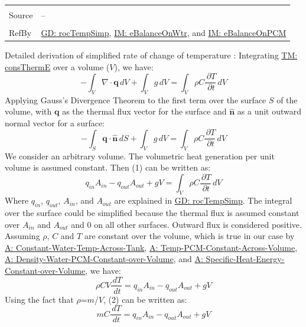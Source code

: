 \documentclass[12pt]{article}
\begin{document}
\begin{minipage}{\textwidth}
\begin{tabular}{>{\raggedright}p{}>{\raggedright\arraybackslash}p{}}
\\ \midrule \\
Source & --
\\ \midrule \\
RefBy & \hyperref[GD:rocTempSimp]{GD: rocTempSimp}, \hyperref[IM:eBalanceOnWtr]{IM: eBalanceOnWtr}, and \hyperref[IM:eBalanceOnPCM]{IM: eBalanceOnPCM}
\\ \bottomrule
\end{tabular}
\end{minipage}
Detailed derivation of simplified rate of change of temperature :
Integrating \hyperref[TM:consThermE]{TM: consThermE} over a volume ($V$), we have:
\begin{displaymath}
-\int_{V}{∇\cdot{}\mathbf{q}}\,dV+\int_{V}{g}\,dV=\int_{V}{ρ C \frac{\,\partial{}T}{\,\partial{}t}}\,dV
\end{displaymath}
Applying Gauss's Divergence Theorem to the first term over the surface $S$ of the volume, with $\mathbf{q}$ as the thermal flux vector for the surface and $\mathbf{\hat{n}}$ as a unit outward normal vector for a surface:
\begin{displaymath}
-\int_{S}{\mathbf{q}\cdot{}\mathbf{\hat{n}}}\,dS+\int_{V}{g}\,dV=\int_{V}{ρ C \frac{\,\partial{}T}{\,\partial{}t}}\,dV
\end{displaymath}
We consider an arbitrary volume. The volumetric heat generation per unit volume is assumed constant. Then (1) can be written as:
\begin{displaymath}
{q_{in}} {A_{in}}-{q_{out}} {A_{out}}+g V=\int_{V}{ρ C \frac{\,\partial{}T}{\,\partial{}t}}\,dV
\end{displaymath}
Where ${q_{in}}$, ${q_{out}}$, ${A_{in}}$, and ${A_{out}}$ are explained in \hyperref[GD:rocTempSimp]{GD: rocTempSimp}. The integral over the surface could be simplified because the thermal flux is assumed constant over ${A_{in}}$ and ${A_{out}}$ and $0$ on all other surfaces. Outward flux is considered positive. Assuming $ρ$, $C$ and $T$ are constant over the volume, which is true in our case by \hyperref[assumpCWTAT]{A: Constant-Water-Temp-Across-Tank}, \hyperref[assumpTPCAV]{A: Temp-PCM-Constant-Across-Volume}, \hyperref[assumpDWPCoV]{A: Density-Water-PCM-Constant-over-Volume}, and \hyperref[assumpSHECov]{A: Specific-Heat-Energy-Constant-over-Volume}, we have:
\begin{displaymath}
ρ C V \frac{\,dT}{\,dt}={q_{in}} {A_{in}}-{q_{out}} {A_{out}}+g V
\end{displaymath}
Using the fact that $ρ$=$m$/$V$, (2) can be written as:
\begin{displaymath}
m C \frac{\,dT}{\,dt}={q_{in}} {A_{in}}-{q_{out}} {A_{out}}+g V
\end{displaymath}
\end{document}
